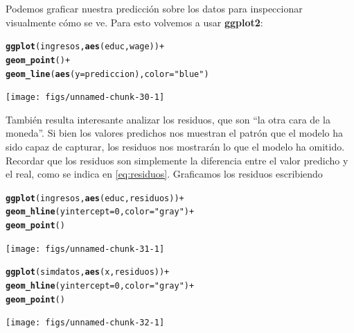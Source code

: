 \documentclass[12pt]{report}\usepackage[]{graphicx}\usepackage[]{color}
\makeatletter
\newcommand{\hlnum}[1]{\textcolor[rgb]{0.686,0.059,0.569}{#1}}%
\newcommand{\hlstr}[1]{\textcolor[rgb]{0.192,0.494,0.8}{#1}}%
\newcommand{\hlopt}[1]{\textcolor[rgb]{0,0,0}{#1}}%
\newcommand{\hlstd}[1]{\textcolor[rgb]{0.345,0.345,0.345}{#1}}%
\newcommand{\hlkwc}[1]{\textcolor[rgb]{0.333,0.667,0.333}{#1}}%
\newcommand{\hlkwd}[1]{\textcolor[rgb]{0.737,0.353,0.396}{\textbf{#1}}}%
\newenvironment{kframe}{%
 \def\at@end@of@kframe{}%
 \ifinner\ifhmode%
  \def\at@end@of@kframe{\end{minipage}}%
  \begin{minipage}{\columnwidth}%
 \fi\fi%
 \def\FrameCommand##1{\hskip\@totalleftmargin \hskip-\fboxsep
 \colorbox{shadecolor}{##1}\hskip-\fboxsep
     \hskip-\linewidth \hskip-\@totalleftmargin \hskip\columnwidth}%
 \MakeFramed {\advance\hsize-\width
   \@totalleftmargin\z@ \linewidth\hsize
   \@setminipage}}%
 {\par\unskip\endMakeFramed%
 \at@end@of@kframe}
\newenvironment{knitrout}{}{} %
\newcommand*{\paq}[1]{\textbf{#1}\index{#1@\textbf{#1}}}
\makeatother
\begin{document}
Podemos graficar nuestra predicción sobre los datos para inspeccionar visualmente cómo se ve. Para esto volvemos a usar \paq{ggplot2}:
\begin{knitrout}
\color{fgcolor}\begin{kframe}
\begin{alltt}
\hlkwd{ggplot}\hlstd{(ingresos,} \hlkwd{aes}\hlstd{(educ, wage))} \hlopt{+}
  \hlkwd{geom_point}\hlstd{()} \hlopt{+}
  \hlkwd{geom_line}\hlstd{(}\hlkwd{aes}\hlstd{(}\hlkwc{y} \hlstd{= prediccion),} \hlkwc{color} \hlstd{=} \hlstr{"blue"}\hlstd{)}
\end{alltt}
\end{kframe}

{\centering \texttt{[image: figs/unnamed-chunk-30-1]} 

}



\end{knitrout}

También resulta interesante analizar los residuos, que son ``la otra cara de la moneda''. Si bien los valores predichos nos muestran el patrón que el modelo ha sido capaz de capturar, los residuos nos mostrarán lo que el modelo ha omitido. Recordar que los residuos son simplemente la diferencia entre el valor predicho y el real, como se indica en \eqref{eq:residuos}. Graficamos los residuos escribiendo

\begin{knitrout}
\color{fgcolor}\begin{kframe}
\begin{alltt}
\hlkwd{ggplot}\hlstd{(ingresos,} \hlkwd{aes}\hlstd{(educ, residuos))} \hlopt{+}
  \hlkwd{geom_hline}\hlstd{(}\hlkwc{yintercept} \hlstd{=} \hlnum{0}\hlstd{,} \hlkwc{color} \hlstd{=} \hlstr{"gray"}\hlstd{)} \hlopt{+}
  \hlkwd{geom_point}\hlstd{()}
\end{alltt}
\end{kframe}

{\centering \texttt{[image: figs/unnamed-chunk-31-1]} 

}



\end{knitrout}

\begin{knitrout}
\color{fgcolor}\begin{kframe}
\begin{alltt}
\hlkwd{ggplot}\hlstd{(simdatos,} \hlkwd{aes}\hlstd{(x, residuos))} \hlopt{+}
  \hlkwd{geom_hline}\hlstd{(}\hlkwc{yintercept} \hlstd{=} \hlnum{0}\hlstd{,} \hlkwc{color} \hlstd{=} \hlstr{"gray"}\hlstd{)} \hlopt{+}
  \hlkwd{geom_point}\hlstd{()}
\end{alltt}
\end{kframe}

{\centering \texttt{[image: figs/unnamed-chunk-32-1]} 

}



\end{knitrout}
\end{document}
